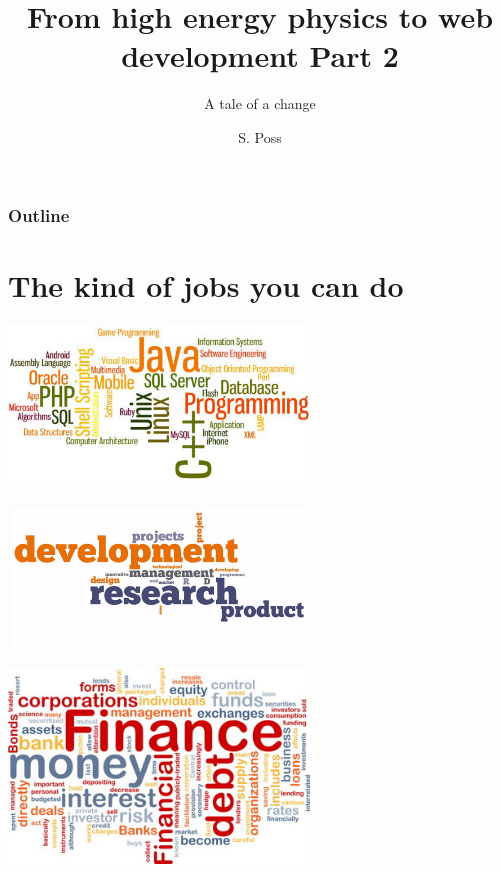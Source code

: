 \documentclass[]{beamer}
\author{S. Poss}
\title{From high energy physics to web development Part 2}
\subtitle{A tale of a change}
\begin{document}
\begin{frame}
\titlepage
\end{frame}

\begin{frame}
\frametitle{Outline}
\tableofcontents
\end{frame}

\section[Jobs]{The kind of jobs you can do}
\begin{frame}
\Huge{\color{blue}{The jobs researchers can do}}
\end{frame}

\begin{frame}
\centering
\includegraphics[width=0.6\textwidth]{cs-cover}
\end{frame}

\begin{frame}
\centering
\includegraphics[width=0.6\textwidth]{ResearchDevelopment}
\end{frame}

\begin{frame}
\centering
\includegraphics[width=0.6\textwidth]{finance}
\end{frame}
\end{document}
